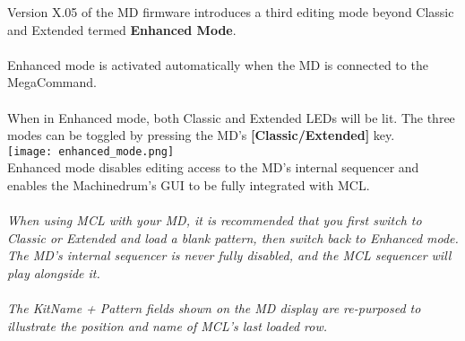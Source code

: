 Version X.05 of the MD firmware introduces a third editing mode beyond Classic and Extended termed \textbf{Enhanced Mode}.\\
\\
Enhanced mode is activated automatically when the MD is connected to the MegaCommand.\\
\\
When in Enhanced mode, both Classic and Extended LEDs will be lit. The three modes can be toggled by pressing the MD's \textbf{[Classic/Extended]} key.\\
\texttt{[image: enhanced\_mode.png]}\\
Enhanced mode disables editing access to the MD's internal sequencer and enables the Machinedrum's GUI to be fully integrated with MCL.
\\\\
\textit{When using MCL with your MD, it is recommended that you first switch to Classic or Extended and load a blank pattern, then switch back to Enhanced mode. The MD's internal sequencer is never fully disabled, and the MCL sequencer will play alongside it.\\\\
The KitName + Pattern fields shown on the MD display are re-purposed to illustrate the position and name of MCL's last loaded row.
}
\newpage

